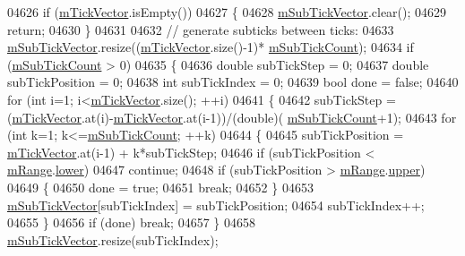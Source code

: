 \begin{DoxyCode}
04626   \textcolor{keywordflow}{if} (\hyperlink{a00025_aae0f9b9973b85be601200f00f5825087}{mTickVector}.isEmpty())
04627   \{
04628     \hyperlink{a00025_a28353081e0ff35c3fe5ced923a287faa}{mSubTickVector}.clear();
04629     \textcolor{keywordflow}{return};
04630   \}
04631   
04632   \textcolor{comment}{// generate subticks between ticks:}
04633   \hyperlink{a00025_a28353081e0ff35c3fe5ced923a287faa}{mSubTickVector}.resize((\hyperlink{a00025_aae0f9b9973b85be601200f00f5825087}{mTickVector}.size()-1)*
      \hyperlink{a00025_ad70198e6ae2801fc409bc3caec707da9}{mSubTickCount});
04634   \textcolor{keywordflow}{if} (\hyperlink{a00025_ad70198e6ae2801fc409bc3caec707da9}{mSubTickCount} > 0)
04635   \{
04636     \textcolor{keywordtype}{double} subTickStep = 0;
04637     \textcolor{keywordtype}{double} subTickPosition = 0;
04638     \textcolor{keywordtype}{int} subTickIndex = 0;
04639     \textcolor{keywordtype}{bool} done = \textcolor{keyword}{false};
04640     \textcolor{keywordflow}{for} (\textcolor{keywordtype}{int} i=1; i<\hyperlink{a00025_aae0f9b9973b85be601200f00f5825087}{mTickVector}.size(); ++i)
04641     \{
04642       subTickStep = (\hyperlink{a00025_aae0f9b9973b85be601200f00f5825087}{mTickVector}.at(i)-\hyperlink{a00025_aae0f9b9973b85be601200f00f5825087}{mTickVector}.at(i-1))/(\textcolor{keywordtype}{double})(
      \hyperlink{a00025_ad70198e6ae2801fc409bc3caec707da9}{mSubTickCount}+1);
04643       \textcolor{keywordflow}{for} (\textcolor{keywordtype}{int} k=1; k<=\hyperlink{a00025_ad70198e6ae2801fc409bc3caec707da9}{mSubTickCount}; ++k)
04644       \{
04645         subTickPosition = \hyperlink{a00025_aae0f9b9973b85be601200f00f5825087}{mTickVector}.at(i-1) + k*subTickStep;
04646         \textcolor{keywordflow}{if} (subTickPosition < \hyperlink{a00025_a1ee36773c49062d751560e11f90845f7}{mRange}.\hyperlink{a00049_aa3aca3edb14f7ca0c85d912647b91745}{lower})
04647           \textcolor{keywordflow}{continue};
04648         \textcolor{keywordflow}{if} (subTickPosition > \hyperlink{a00025_a1ee36773c49062d751560e11f90845f7}{mRange}.\hyperlink{a00049_ae44eb3aafe1d0e2ed34b499b6d2e074f}{upper})
04649         \{
04650           done = \textcolor{keyword}{true};
04651           \textcolor{keywordflow}{break};
04652         \}
04653         \hyperlink{a00025_a28353081e0ff35c3fe5ced923a287faa}{mSubTickVector}[subTickIndex] = subTickPosition;
04654         subTickIndex++;
04655       \}
04656       \textcolor{keywordflow}{if} (done) \textcolor{keywordflow}{break};
04657     \}
04658     \hyperlink{a00025_a28353081e0ff35c3fe5ced923a287faa}{mSubTickVector}.resize(subTickIndex);

\end{DoxyCode}
